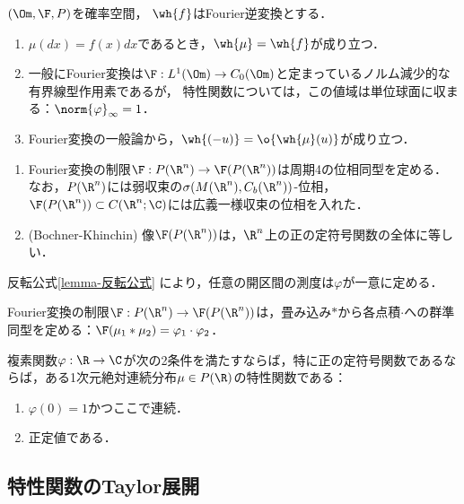 \documentclass[uplatex,dvipdfmx]{jsreport}
\begin{document}
\begin{lemma}
    $(\Om,\F,P)$を確率空間，
    $\wh{f}$はFourier逆変換とする．
    \begin{enumerate}
        \item $\mu(dx)=f(x)dx$であるとき，$\wh{\mu}=\wh{f}$が成り立つ．
        \item 一般にFourier変換は$\F:L^1(\Om)\to C_0(\Om)$と定まっているノルム減少的な有界線型作用素であるが，
        特性関数については，この値域は単位球面に収まる：$\norm{\varphi}_\infty=1$．
        \item Fourier変換の一般論から，$\wh{(-u)}=\o{\wh{\mu}(u)}$が成り立つ．
    \end{enumerate}
\end{lemma}

\begin{theorem}[一意性定理]\mbox{}
    \begin{enumerate}
        \item Fourier変換の制限$\F:P(\R^n)\to \F(P(\R^n))$は周期4の位相同型を定める．なお，$P(\R^n)$には弱収束の$\sigma(M(\R^n),C_b(\R^n))$-位相，$\F(P(\R^n))\subset C(\R^n;\C)$には広義一様収束の位相を入れた．
        \item (Bochner-Khinchin) 像$\F(P(\R^n))$は，$\R^n$上の正の定符号関数の全体に等しい．
    \end{enumerate}
\end{theorem}
\begin{Proof}
    反転公式\ref{lemma-反転公式}
    により，任意の開区間の測度は$\varphi$が一意に定める．
\end{Proof}

\begin{theorem}[群準同型]
    Fourier変換の制限$\F:P(\R^n)\to \F(P(\R^n))$は，畳み込み$*$から各点積$\cdot$への群準同型を定める：$\F(\mu_1*\mu_2)=\varphi_1\cdot\varphi_2$．
\end{theorem}

\begin{theorem}
    複素関数$\varphi:\R\to\C$が次の2条件を満たすならば，特に正の定符号関数であるならば，ある1次元絶対連続分布$\mu\in P(\R)$の特性関数である：
    \begin{enumerate}
        \item $\varphi(0)=1$かつここで連続．
        \item 正定値である．
    \end{enumerate}
\end{theorem}

\subsection{特性関数のTaylor展開}
\end{document}
